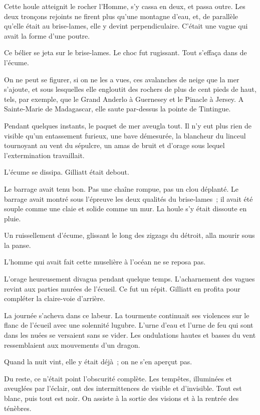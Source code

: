 \documentclass[french,twoside]{book} %
\begin{document}
Cette houle atteignit le rocher l’Homme, s’y cassa en deux, et passa outre. Les deux tronçons rejoints  ne firent plus qu’une montagne d’eau, et, de parallèle qu’elle était au brise-lames, elle y devint perpendiculaire. C’était une vague qui avait la forme d’une poutre.\par
Ce bélier se jeta sur le brise-lames. Le choc fut rugissant. Tout s’effaça dans de l’écume.\par
On ne peut se figurer, si on ne les a vues, ces avalanches de neige que la mer s’ajoute, et sous lesquelles elle engloutit des rochers de plus de cent pieds de haut, tels, par exemple, que le Grand Anderlo à Guernesey et le Pinacle à Jersey. A Sainte-Marie de Madagascar, elle saute par-dessus la pointe de Tintingue.\par
Pendant quelques instants, le paquet de mer aveugla tout. Il n’y eut plus rien de visible qu’un entassement furieux, une bave démesurée, la blancheur du linceul tournoyant au vent du sépulcre, un amas de bruit et d’orage sous lequel l’extermination travaillait.\par
L’écume se dissipa. Gilliatt était debout.\par
Le barrage avait tenu bon. Pas une chaîne rompue, pas un clou déplanté. Le barrage avait montré sous l’épreuve les deux qualités du brise-lames ; il avait été souple comme une claie et solide comme un mur. La houle s’y était dissoute en pluie.\par
Un ruissellement d’écume, glissant le long des zigzags du détroit, alla mourir sous la panse.\par
L’homme qui avait fait cette muselière à l’océan ne se reposa pas.\par
L’orage heureusement divagua pendant quelque temps. L’acharnement des vagues revint aux parties murées de l’écueil. Ce fut un répit. Gilliatt en profita pour compléter la claire-voie d’arrière.\par
 La journée s’acheva dans ce labeur. La tourmente continuait ses violences sur le flanc de l’écueil avec une solennité lugubre. L’urne d’eau et l’urne de feu qui sont dans les nuées se versaient sans se vider. Les ondulations hautes et basses du vent ressemblaient aux mouvements d’un dragon.\par
Quand la nuit vint, elle y était déjà ; on ne s’en aperçut pas.\par
Du reste, ce n’était point l’obscurité complète. Les tempêtes, illuminées et aveuglées par l’éclair, ont des intermittences de visible et d’invisible. Tout est blanc, puis tout est noir. On assiste à la sortie des visions et à la rentrée des ténèbres.\par
\end{document}
